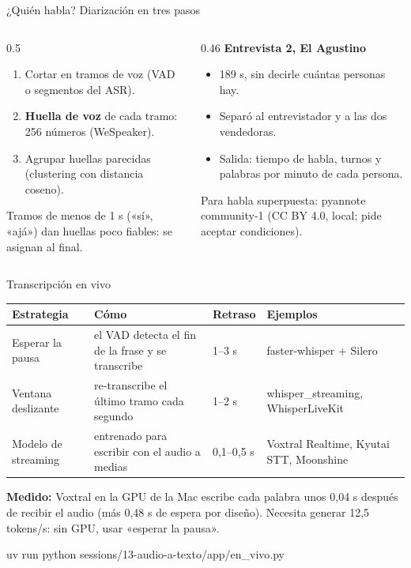 \documentclass[aspectratio=169,11pt]{beamer}
\newcommand{\cod}[1]{{\small\ttfamily #1}}
\begin{document}
\begin{frame}{¿Quién habla? Diarización en tres pasos}
  \begin{columns}[T]
    \begin{column}{0.5\textwidth}
      \begin{enumerate}
        \item Cortar en tramos de voz (VAD o segmentos del ASR).
        \item \textbf{Huella de voz} de cada tramo: 256 números (WeSpeaker).
        \item Agrupar huellas parecidas (clustering con distancia coseno).
      \end{enumerate}
      \vspace{6pt}
      \small Tramos de menos de 1 s («sí», «ajá») dan huellas poco fiables: se asignan al final.
    \end{column}
    \begin{column}{0.46\textwidth}
      \textbf{Entrevista 2, El Agustino}\\[3pt]
      \small
      \begin{itemize}
        \item 189 s, sin decirle cuántas personas hay.
        \item Separó al entrevistador y a las dos vendedoras.
        \item Salida: tiempo de habla, turnos y palabras por minuto de cada persona.
      \end{itemize}
      \vspace{4pt}
      \footnotesize Para habla superpuesta: \cod{pyannote community-1} (CC BY 4.0, local; pide aceptar condiciones).
    \end{column}
  \end{columns}
\end{frame}

\begin{frame}{Transcripción en vivo}
  \small
  \begin{tabular}{p{3cm}p{5.6cm}lp{3.2cm}}
    \toprule
    \textbf{Estrategia} & \textbf{Cómo} & \textbf{Retraso} & \textbf{Ejemplos} \\
    \midrule
    Esperar la pausa & el VAD detecta el fin de la frase y se transcribe & 1--3 s & faster-whisper + Silero \\
    Ventana deslizante & re-transcribe el último tramo cada segundo & 1--2 s & whisper\_streaming, WhisperLiveKit \\
    Modelo de streaming & entrenado para escribir con el audio a medias & 0,1--0,5 s & \alert{Voxtral Realtime}, Kyutai STT, Moonshine \\
    \bottomrule
  \end{tabular}

  \vspace{10pt}
  \textbf{Medido:} Voxtral en la GPU de la Mac escribe cada palabra unos 0,04 s después de recibir el audio
  (más 0,48 s de espera por diseño). Necesita generar 12,5 tokens/s: sin GPU, usar «esperar la pausa».

  \vspace{6pt}
  \cod{uv run python sessions/13-audio-a-texto/app/en\_vivo.py}
\end{frame}
\end{document}
